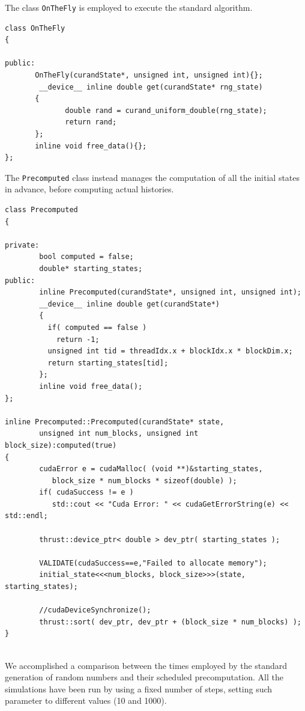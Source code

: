 \documentclass[a4paper,10pt]{article}
\begin{document}
The class \texttt{OnTheFly} is employed to execute the standard algorithm. 

\hspace*{-2cm}
\begin{lstlisting}
class OnTheFly
{

public: 
       OnTheFly(curandState*, unsigned int, unsigned int){};
        __device__ inline double get(curandState* rng_state)
       {
              double rand = curand_uniform_double(rng_state);
              return rand;
       };
       inline void free_data(){};
};

\end{lstlisting}

The \texttt{Precomputed} class instead manages the computation of all the 
initial states in advance, before computing actual histories. 


\hspace*{-2cm}
\begin{lstlisting}
class Precomputed
{

private:
        bool computed = false;
        double* starting_states;
public:
        inline Precomputed(curandState*, unsigned int, unsigned int);
        __device__ inline double get(curandState*)
        {
          if( computed == false )
            return -1;
          unsigned int tid = threadIdx.x + blockIdx.x * blockDim.x;
          return starting_states[tid];
        };
        inline void free_data();
};

inline Precomputed::Precomputed(curandState* state,
        unsigned int num_blocks, unsigned int block_size):computed(true)
{
        cudaError e = cudaMalloc( (void **)&starting_states,
           block_size * num_blocks * sizeof(double) );
        if( cudaSuccess != e )
           std::cout << "Cuda Error: " << cudaGetErrorString(e) << std::endl;

        thrust::device_ptr< double > dev_ptr( starting_states );

        VALIDATE(cudaSuccess==e,"Failed to allocate memory");
        initial_state<<<num_blocks, block_size>>>(state, starting_states);

        //cudaDeviceSynchronize();
        thrust::sort( dev_ptr, dev_ptr + (block_size * num_blocks) );
}
                                                               
\end{lstlisting}

We accomplished a comparison between the times employed by the standard 
generation of random numbers and their scheduled precomputation. All 
the simulations have been run by using a fixed number of steps, setting such 
parameter to different values (10 and 1000). 
\end{document}
